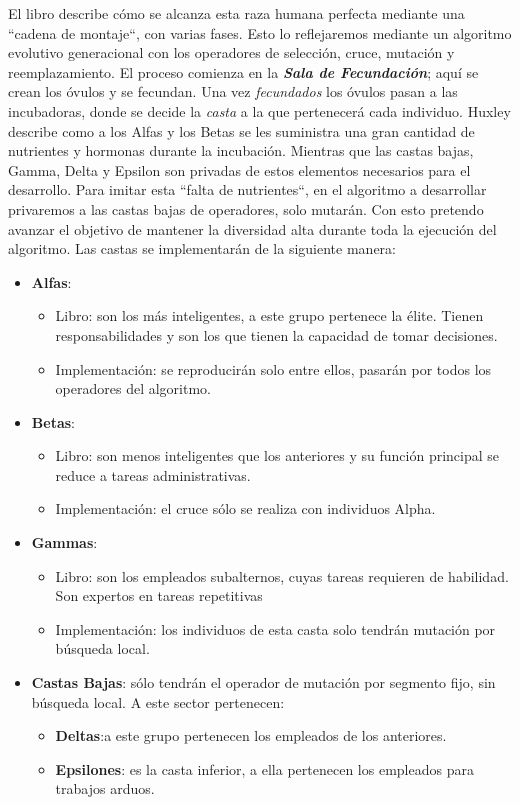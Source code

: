 El libro describe cómo se alcanza esta raza humana perfecta mediante una ``cadena de montaje``, con varias fases. Esto lo 
reflejaremos mediante un algoritmo evolutivo generacional con los operadores de selección, cruce, mutación y reemplazamiento. 
El proceso comienza en la \textbf{\textit{Sala de Fecundación}}; aquí se crean los óvulos y se fecundan. Una vez \textit{fecundados}
los óvulos pasan a las incubadoras, donde se decide la \textit{casta} a la que pertenecerá cada individuo. Huxley describe 
como a los Alfas y los Betas se les suministra una gran cantidad de nutrientes y hormonas durante la incubación. Mientras que las 
castas bajas, Gamma, Delta y Epsilon son privadas de estos elementos necesarios para el desarrollo. Para imitar esta
 ``falta de nutrientes``, en el algoritmo a desarrollar privaremos a las castas bajas de operadores, solo mutarán. Con esto
 pretendo avanzar el objetivo de mantener la diversidad alta durante toda la ejecución del algoritmo. 
 Las castas se implementarán de la siguiente manera: 

\begin{itemize}
    \item \textbf{Alfas}:
        \begin{itemize}
            \item Libro: son los más inteligentes, a este grupo pertenece la élite. Tienen responsabilidades y son
            los que tienen la capacidad de tomar decisiones.
            \item Implementación: se reproducirán solo entre ellos, pasarán por todos los operadores del algoritmo.
        \end{itemize}
    \item \textbf{Betas}: 
        \begin{itemize}
            \item Libro: son menos inteligentes que los anteriores y su función principal se reduce a tareas
            administrativas.
            \item  Implementación: el cruce sólo se realiza con individuos Alpha.
        \end{itemize}
    \item \textbf{Gammas}: 
        \begin{itemize}
            \item Libro: son los empleados subalternos, cuyas tareas requieren de habilidad. Son expertos en tareas repetitivas
            \item Implementación: los individuos de esta casta solo tendrán mutación por búsqueda local.
        \end{itemize}
    \item \textbf{Castas Bajas}: sólo tendrán el operador de mutación por segmento fijo, sin búsqueda local. A este sector pertenecen:
        \begin{itemize}
            \item \textbf{Deltas}:a este grupo pertenecen los empleados de los anteriores.
            \item \textbf{Epsilones}: es la casta inferior, a ella pertenecen los empleados para trabajos arduos.
        \end{itemize}
\end{itemize}


